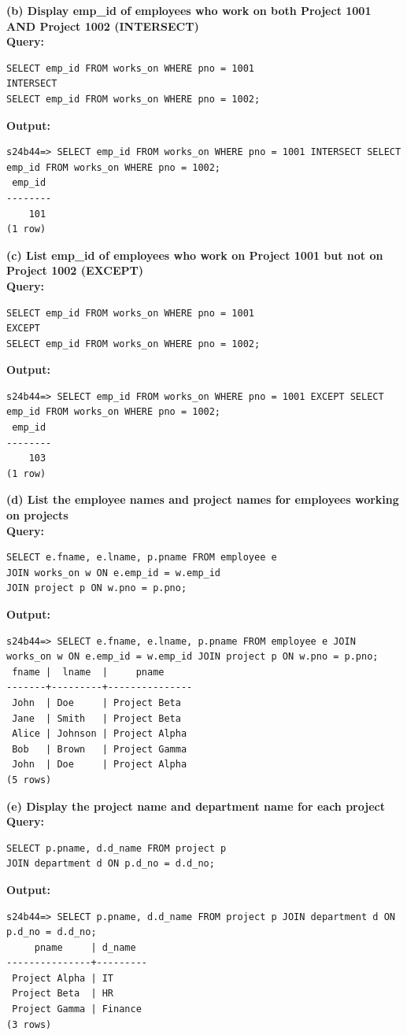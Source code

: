 \documentclass[12pt, a4paper]{article}
\begin{document}
\textbf{(b) Display emp\_id of employees who work on both Project 1001 AND Project 1002 (INTERSECT)}\\
\textbf{Query:}
\begin{lstlisting}
SELECT emp_id FROM works_on WHERE pno = 1001
INTERSECT
SELECT emp_id FROM works_on WHERE pno = 1002;
\end{lstlisting}
\textbf{Output:}
\begin{lstlisting}[style=terminal]
s24b44=> SELECT emp_id FROM works_on WHERE pno = 1001 INTERSECT SELECT emp_id FROM works_on WHERE pno = 1002;
 emp_id 
--------
    101
(1 row)
\end{lstlisting}

\textbf{(c) List emp\_id of employees who work on Project 1001 but not on Project 1002 (EXCEPT)}\\
\textbf{Query:}
\begin{lstlisting}
SELECT emp_id FROM works_on WHERE pno = 1001
EXCEPT
SELECT emp_id FROM works_on WHERE pno = 1002;
\end{lstlisting}
\textbf{Output:}
\begin{lstlisting}[style=terminal]
s24b44=> SELECT emp_id FROM works_on WHERE pno = 1001 EXCEPT SELECT emp_id FROM works_on WHERE pno = 1002;
 emp_id 
--------
    103
(1 row)
\end{lstlisting}

\textbf{(d) List the employee names and project names for employees working on projects}\\
\textbf{Query:}
\begin{lstlisting}
SELECT e.fname, e.lname, p.pname FROM employee e
JOIN works_on w ON e.emp_id = w.emp_id
JOIN project p ON w.pno = p.pno;
\end{lstlisting}
\textbf{Output:}
\begin{lstlisting}[style=terminal]
s24b44=> SELECT e.fname, e.lname, p.pname FROM employee e JOIN works_on w ON e.emp_id = w.emp_id JOIN project p ON w.pno = p.pno;
 fname |  lname  |     pname     
-------+---------+---------------
 John  | Doe     | Project Beta
 Jane  | Smith   | Project Beta
 Alice | Johnson | Project Alpha
 Bob   | Brown   | Project Gamma
 John  | Doe     | Project Alpha
(5 rows)
\end{lstlisting}

\textbf{(e) Display the project name and department name for each project}\\
\textbf{Query:}
\begin{lstlisting}
SELECT p.pname, d.d_name FROM project p 
JOIN department d ON p.d_no = d.d_no;
\end{lstlisting}
\textbf{Output:}
\begin{lstlisting}[style=terminal]
s24b44=> SELECT p.pname, d.d_name FROM project p JOIN department d ON p.d_no = d.d_no;
     pname     | d_name  
---------------+---------
 Project Alpha | IT
 Project Beta  | HR
 Project Gamma | Finance
(3 rows)
\end{lstlisting}
\end{document}
